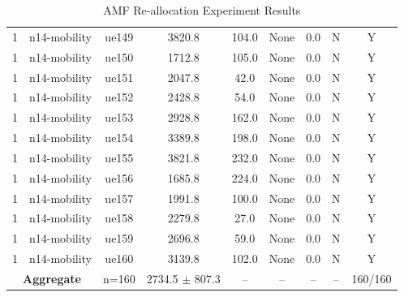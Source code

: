 \begin{table}[ht]
\begin{tabular}{|c|c|c|c|c|c|c|c|c|}
1 & n14-mobility & ue149 & 3820.8 & 104.0 & None & 0.0 & N & Y \\
1 & n14-mobility & ue150 & 1712.8 & 105.0 & None & 0.0 & N & Y \\
1 & n14-mobility & ue151 & 2047.8 & 42.0 & None & 0.0 & N & Y \\
1 & n14-mobility & ue152 & 2428.8 & 54.0 & None & 0.0 & N & Y \\
1 & n14-mobility & ue153 & 2928.8 & 162.0 & None & 0.0 & N & Y \\
1 & n14-mobility & ue154 & 3389.8 & 198.0 & None & 0.0 & N & Y \\
1 & n14-mobility & ue155 & 3821.8 & 232.0 & None & 0.0 & N & Y \\
1 & n14-mobility & ue156 & 1685.8 & 224.0 & None & 0.0 & N & Y \\
1 & n14-mobility & ue157 & 1991.8 & 100.0 & None & 0.0 & N & Y \\
1 & n14-mobility & ue158 & 2279.8 & 27.0 & None & 0.0 & N & Y \\
1 & n14-mobility & ue159 & 2696.8 & 59.0 & None & 0.0 & N & Y \\
1 & n14-mobility & ue160 & 3139.8 & 102.0 & None & 0.0 & N & Y \\
\multicolumn{2}{|c|}{\textbf{Aggregate}} & n=160 & 2734.5 $\pm$ 807.3 & -- & -- & -- & -- & 160/160 \\
\hline
\end{tabular}
\caption{AMF Re-allocation Experiment Results}
\label{tab:amf_realloc}
\end{table}

